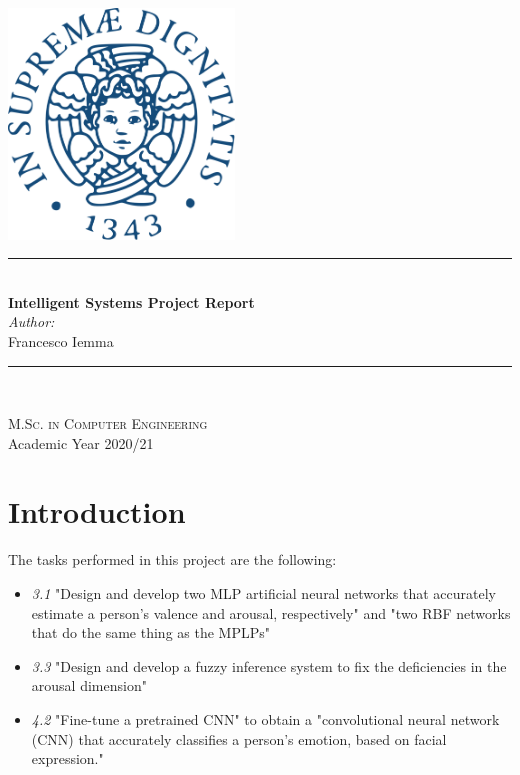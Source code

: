 \documentclass[a4paper]{report}
\newcommand{\HRule}{\rule{\linewidth}{0.5mm}}
\begin{document}
	\begin{titlepage}
		\begin{center}
			
			\includegraphics[width=0.45\textwidth]{img/unipi.png}~\\[2.5cm]
			
			
			\HRule \\[0.4cm]
			{ \LARGE 
				\Huge\textbf{Intelligent Systems Project Report}\\[0.5cm]
				\LARGE\textit{Author:} \\[0.1cm]
				Francesco Iemma \\[0.1cm]
			}
			\HRule \\[1.5cm]
			
			
			
			{ \Large
			}
			
			\vfill
			
			\textsc{\large M.Sc. in Computer Engineering}\\[0.4cm]
			
			
			{\large Academic Year 2020/21}
			
		\end{center}
	\end{titlepage}
	
	
	\tableofcontents
	
\chapter*{Introduction}
	The tasks performed in this project are the following:
	\begin{itemize}
		\item \textit{3.1} "Design and develop two MLP artificial neural networks that accurately estimate a person's valence and arousal, respectively" and "two RBF networks that do the same thing as the MPLPs"
		
		\item \textit{3.3} "Design and develop a fuzzy inference system to fix the deficiencies in the arousal dimension"
		
		\item \textit{4.2} "Fine-tune a pretrained CNN" to  obtain a "convolutional neural network (CNN) that accurately classifies a person's emotion, based on facial expression."
	\end{itemize}
\end{document}
